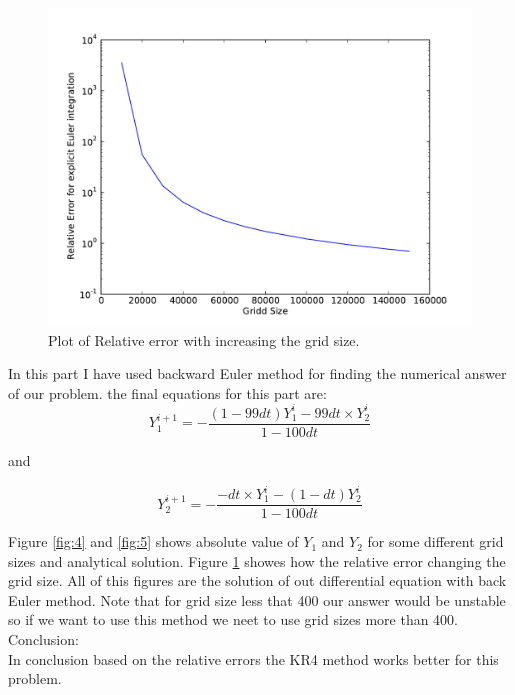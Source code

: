 \documentclass[10pt]{article}
\begin{document}
\begin{figure}[hbt]
 \centering
 \label{fig:6} \includegraphics[scale=0.4]{Plots/plot6.pdf}
 \caption{ Plot of Relative error with increasing the grid size.}
\end{figure}

In this part I have used backward Euler method for finding the numerical answer of our problem. the final equations for this part are:\\

\begin{equation}
 Y_1^{i+1} = - \frac{(1-99dt)Y_1^i - 99dt \times Y_2^i}{1 - 100dt}
\end{equation}

and 

\begin{equation}
 Y_2^{i+1} = - \frac{ - dt \times Y_1^i - (1- dt) Y_2^i}{1 - 100dt}
\end{equation}

Figure \ref{fig:4} and \ref{fig:5} shows absolute value of $Y_1$ and $Y_2$ for some different grid sizes and analytical solution. Figure \ref{fig:6} showes how the relative error changing the grid size. All of this figures are the solution of out differential equation with back Euler method. Note that for grid size less that 400 our answer would be unstable so if we want to use this method we neet to use grid sizes more than 400. \\ 

Conclusion: \\
In conclusion based on the relative errors the KR4 method works better for this problem.
\end{document}

